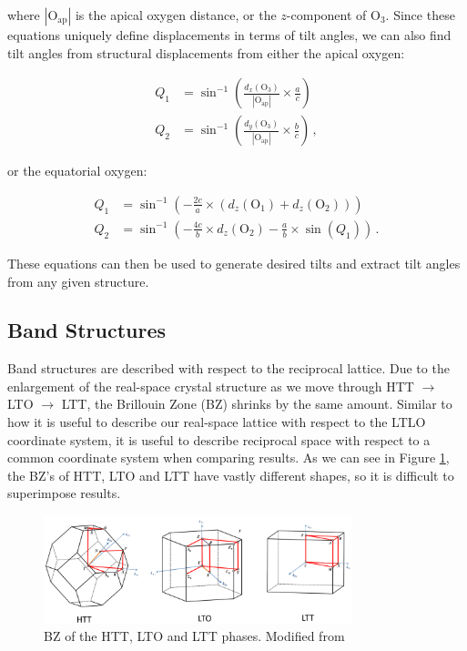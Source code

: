 \noindent where $| \text{O}_\text{ap} |$ is the apical oxygen distance, or the $z$-component of O$_3$. Since these equations uniquely define displacements in terms of tilt angles, we can also find tilt angles from structural displacements from either the apical oxygen:

\begin{align*}
Q_1 &= \sin^{-1} \left( \frac{d_x(\text{O}_3)}{| \text{O}_\text{ap} |} \times \frac{a}{c} \right) \\
Q_2 &= \sin^{-1} \left( \frac{d_y(\text{O}_3)}{| \text{O}_\text{ap} |} \times \frac{b}{c} \right) \, ,
\end{align*}

\noindent or the equatorial oxygen:

\begin{align*}
Q_1 &= \sin^{-1}  \left( - \frac{2c}{a} \times (d_z(\text{O}_1) + d_z(\text{O}_2)) \right) \\
Q_2 &= \sin^{-1}  \left( -\frac{4c}{b} \times d_z(\text{O}_2) - \frac{a}{b} \times \sin (Q_1) \right) \, .
\end{align*}

\noindent These equations can then be used to generate desired tilts and extract tilt angles from any given structure.

\subsection{Band Structures}
Band structures are described with respect to the reciprocal lattice. Due to the enlargement of the real-space crystal structure as we move through HTT $\rightarrow$ LTO $\rightarrow$ LTT, the Brillouin Zone (BZ) shrinks by the same amount. Similar to how it is useful to describe our real-space lattice with respect to the LTLO coordinate system, it is useful to describe reciprocal space with respect to a common coordinate system when comparing results. As we can see in Figure \ref{fig:allbz}, the BZ's of HTT, LTO and LTT have vastly different shapes, so it is difficult to superimpose results.

\begin{figure}
	\centering
	\includegraphics[width=0.8\textwidth]{fig/simulation/BZAll.png}
	\caption[HTT LTO LTT BZs]{BZ of the HTT, LTO and LTT phases. Modified from \cite{Hinuma2017}}
	\label{fig:allbz}
\end{figure}

